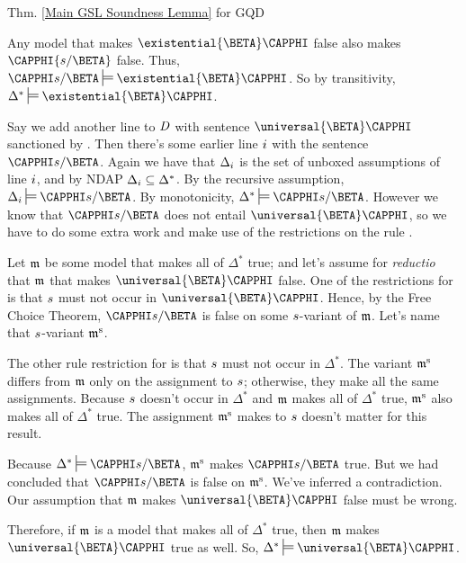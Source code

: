 \begin{PROOFOF}{Thm. \ref{Main GSL Soundness Lemma} for GQD}
\begin{description}
\begin{description}
Any model that makes $\existential{\BETA}\CAPPHI$ false also makes $\CAPPHI{\variable{s}/\BETA}$ false.  Thus,  $\CAPPHI\variable{s}/\BETA\sdtstile{}{}\existential{\BETA}\CAPPHI$. So by transitivity, $\Delta^*\sdtstile{}{}\existential{\BETA}\CAPPHI$.

\item[\Rule{$\forall$-Intro}:]
Say we add another line to $\mathit{D}$ with sentence $\universal{\BETA}\CAPPHI$ sanctioned by .
Then there's some earlier line $i$ with the sentence $\CAPPHI\variable{s}/\BETA$. 
Again we have that $\Delta_{i}$ is the set of unboxed assumptions of line $i$, and by NDAP $\Delta_{i}\subseteq\Delta^*$.
By the recursive assumption, $\Delta_{\integer{i}}\sdtstile{}{}\CAPPHI\variable{s}/\BETA$. 
By monotonicity, $\Delta^*\sdtstile{}{}\CAPPHI\variable{s}/\BETA$.
However we know that $\CAPPHI\variable{s}/\BETA$ does not entail $\universal{\BETA}\CAPPHI$, so we have to do some extra work and make use of the restrictions on the rule . 

Let $\mathfrak{m}$ be some model that makes all of $\Delta^*$ true; and let's assume for \emph{reductio} that $\mathfrak{m}$ that makes $\universal{\BETA}\CAPPHI$ false.  One of the restrictions for  is that $s$ must not occur in $\universal{\BETA}\CAPPHI$.  Hence, by the Free Choice Theorem, $\CAPPHI\variable{s}/\BETA$ is false on some $s$-variant of $\mathfrak{m}$.  Let's name that $s$-variant $\mathfrak{m^{\mathrm{s}}_{\mathrm{}}}$.

The other rule restriction for  is that $s$ must not occur in $\Delta^*$.  The variant $\mathfrak{m^{\mathrm{s}}_{\mathrm{}}}$ differs from $\mathfrak{m}$ only on the assignment to $s$; otherwise, they make all the same assignments.  Because $s$ doesn't occur in $\Delta^*$ and $\mathfrak{m}$ makes all of $\Delta^*$ true, $\mathfrak{m^{\mathrm{s}}_{\mathrm{}}}$ also makes all of $\Delta^*$ true.  The assignment $\mathfrak{m^{\mathrm{s}}_{\mathrm{}}}$ makes to $s$ doesn't matter for this result.

Because $\Delta^*\sdtstile{}{}\CAPPHI\variable{s}/\BETA$, $\mathfrak{m^{\mathrm{s}}_{\mathrm{}}}$ makes $\CAPPHI\variable{s}/\BETA$ true.  But we had concluded that $\CAPPHI\variable{s}/\BETA$ is false on $\mathfrak{m^{\mathrm{s}}_{\mathrm{}}}$.  We've inferred a contradiction.  Our assumption that $\mathfrak{m}$ makes $\universal{\BETA}\CAPPHI$ false must be wrong.

Therefore, if $\mathfrak{m}$ is a model that makes all of $\Delta^*$ true, then $\mathfrak{m}$ makes $\universal{\BETA}\CAPPHI$ true as well. 
So, $\Delta^*\sdtstile{}{}\universal{\BETA}\CAPPHI$.


\end{description}
\end{description}
\end{PROOFOF}

